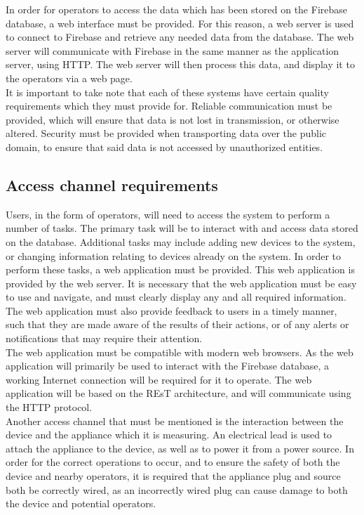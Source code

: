 \documentclass{article}
\begin{document}
	In order for operators to access the data which has been stored on 
	the Firebase database, a web interface must be provided. For this 
	reason, a web server is used to connect to Firebase and retrieve any 
	needed data from the database. The web server will communicate with 
	Firebase in the same manner as the application server, using HTTP. 
	The web server will then process this data, and display it to the 
	operators via a web page.\\
	
	It is important to take note that each of these systems have certain 
	quality requirements which they must provide for. Reliable 
	communication must be provided, which will ensure that data is not 
	lost in transmission, or otherwise altered. Security must be provided 
	when transporting data over the public domain, to ensure that said 
	data is not accessed by unauthorized entities.
	
	\newpage
	
	\subsection{Access channel requirements}
	
	Users, in the form of operators, will need to access the system to 
	perform a number of tasks. The primary task will be to interact with 
	and access data stored on the database. Additional tasks may include 
	adding new devices to the system, or changing information relating to 
	devices already on the system. In order to perform these tasks, a web 
	application must be provided. This web application is provided by the 
	web server. It is necessary that the web application must be easy to 
	use and navigate, and must clearly display any and all required 
	information. The web application must also provide feedback to users 
	in a timely manner, such that they are made aware of the results of 
	their actions, or of any alerts or notifications that may require 
	their attention.\\
	
	The web application must be compatible with modern web browsers. As 
	the web application will primarily be used to interact with the 
	Firebase database, a working Internet connection will be required for 
	it to operate. The web application will be based on the REsT 
	architecture, and will communicate using the HTTP protocol.\\
	
	Another access channel that must be mentioned is the interaction 
	between the device and the appliance which it is measuring. An 
	electrical lead is used to attach the appliance to the device, as 
	well as to power it from a power source. In order for the correct 
	operations to occur, and to ensure the safety of both the device and 
	nearby operators, it is required that the appliance plug and source 
	both be correctly wired, as an incorrectly wired plug can cause 
	damage to both the device and potential operators.
	
\end{document}
